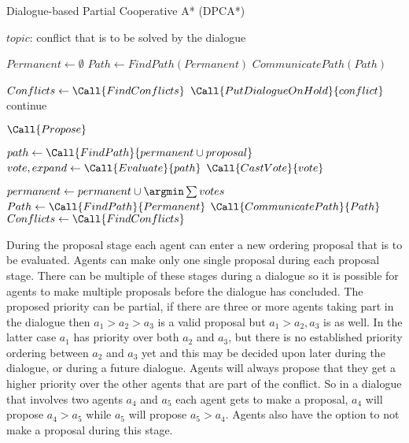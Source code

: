 \begin{algorithm}[t]
    \caption{Dialogue-based Partial Cooperative A* (DPCA*)}
    \label{alg:dpca}
    \begin{algorithmic}[1]
        \Require $topic$: conflict that is to be solved by the dialogue
        
        \State $Permanent \gets \emptyset$
        \State $Path \gets FindPath(Permanent)$
        \State $CommunicatePath(Path)$
        
        \State $Conflicts \gets \Call{FindConflicts}$
                \State $\Call{PutDialogueOnHold}{conflict}$
                \State continue
             \EndIf
        
            \Repeat
                \State $\Call{Propose}$
                
            
            \State $path \gets \Call{FindPath}{permanent \cup proposal}$
            \State $vote, expand \gets \Call{Evaluate}{path}$
            \State $\Call{CastVote}{vote}$
            \EndFor
        
            
            \State $permanent \gets permanent \cup {\argmin \sum votes}$
            \State $Path \gets \Call{FindPath}{Permanent}$
            \State $\Call{CommunicatePath}{Path}$
            \State $Conflicts \gets \Call{FindConflicts}$
        \EndFor
    \end{algorithmic}
\end{algorithm}

During the proposal stage each agent can enter a new ordering proposal that is
to be evaluated. Agents can make only one single proposal during each proposal
stage. There can be multiple of these stages during a dialogue so it is
possible for agents to make multiple proposals before the dialogue has
concluded. The proposed priority can be
partial, if there are three or more agents taking part in the dialogue then
$a_1 > a_2 > a_3$ is a valid proposal but $a_1 > a_2, a_3$ is as well. In the
latter case $a_1$ has priority over both $a_2$ and $a_3$, but there is no
established priority ordering between $a_2$ and $a_3$ yet and this may be
decided upon later during the dialogue, or during a future dialogue. Agents
will always propose that they get a higher priority over the other agents that
are part of the conflict. So in a dialogue that involves two agents $a_4$ and
$a_5$ each agent gets to make a proposal, $a_4$ will propose $a_4 > a_5$ while
$a_5$ will propose $a_5 > a_4$. Agents also have the option to not make a 
proposal during this stage.

